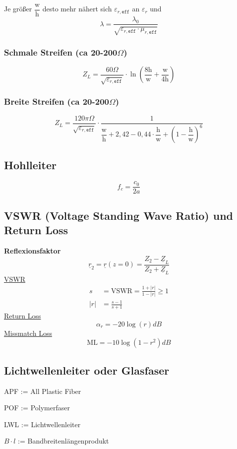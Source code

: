 Je größer $\dfrac{\mathrm{w}}{\mathrm{h}}$ desto mehr nähert sich $\varepsilon_{r,\texttt{eff}}$ an $\varepsilon_r$ und 
\[
    \lambda = \frac{\lambda_0}{\sqrt{\varepsilon_{r,\texttt{eff}}\cdot\mu_{r,\texttt{eff}}}}
\]

\subsubsection[Schmale Streifen]{Schmale Streifen (ca 20-200$\Omega$)}
\[
    Z_L = \frac{60\Omega}{\sqrt{\varepsilon_{r,\texttt{eff}}}}\cdot\ln\left(\frac{8\mathrm{h}}{\mathrm{w}}+\frac{\mathrm{w}}{4\mathrm{h}}\right)
\]
\subsubsection[Breite Streifen]{Breite Streifen (ca 20-200$\Omega$)}
\[
    Z_L = \frac{120\pi\Omega}{\sqrt{\varepsilon_{r,\texttt{eff}}}}\cdot\frac{1}{\dfrac{\mathrm{w}}{\mathrm{h}}+2,42-0,44\cdot\dfrac{\mathrm{h}}{\mathrm{w}}+\left(1-\dfrac{\mathrm{h}}{\mathrm{w}}\right)^6}
\]

\subsection{Hohlleiter}
\[
    f_c = \frac{c_0}{2a}
\]

\subsection{VSWR (Voltage Standing Wave Ratio) und Return Loss}\label{sec:VSWR}
\textbf{Reflexionsfaktor}\\
          \[ \underline{r}_2 = \underline{r}(z=0) = \frac{Z_2 - \underline{Z}_L}{Z_2 + \underline{Z}_L} \]
\underline{VSWR}
\begin{align*}
    s   & = \mathrm{VSWR} = \frac{1+|r|}{1-|r|}\geq 1 \\
    |r| & = \frac{s-1}{s+1}
\end{align*}
\underline{Return Loss}
\[
    \alpha_r = -20\log(r)dB
\]
\underline{Missmatch Loss}
\[
    \mathrm{ML} = -10\log(1-r^2)dB
\]
\subsection{Lichtwellenleiter oder Glasfaser}

\begin{description}
    \setlength\itemsep{1pt}
    \item APF := All Plastic Fiber
    \item POF := Polymerfaser
    \item LWL := Lichtwellenleiter
    \item $B\cdot l$ := Bandbreitenlängenprodukt
\end{description}

